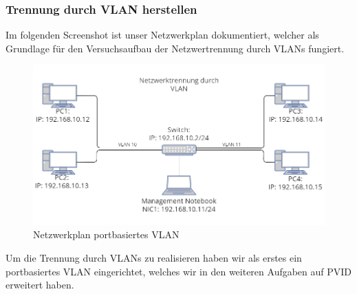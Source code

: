         \subsubsection{Trennung durch VLAN herstellen}
        Im folgenden Screenshot ist unser Netzwerkplan dokumentiert, welcher als Grundlage für
        den Versuchsaufbau der Netzwertrennung durch VLANs fungiert.
        \begin{figure}[H]
            \centering
            \includegraphics[width=\linewidth]{images/Trennung durch VLAN herstellen/Netzwerkplan_VLAN._portbasiert.png}
            \caption{Netzwerkplan portbasiertes VLAN}
        \end{figure}
        Um die Trennung durch VLANs zu realisieren haben wir als erstes ein portbasiertes VLAN eingerichtet, welches wir
        in den weiteren Aufgaben auf PVID erweitert haben.
